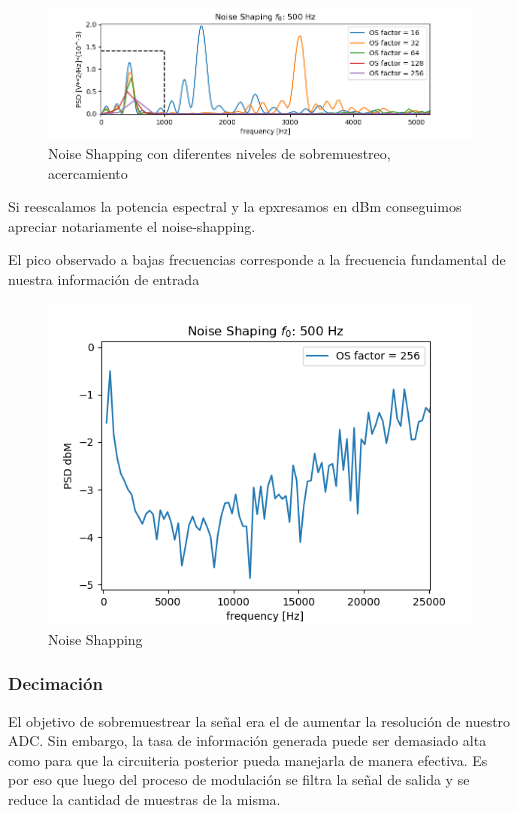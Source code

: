 \begin{figure}[H]
	\centering
	\includegraphics[width=\linewidth]{ImagenesEjercicio2/NoiseShappingSolidZoom.png}
	\caption{Noise Shapping con diferentes niveles de sobremuestreo, acercamiento}
	\label{fig:noiseshappingdemo1}
\end{figure}

Si reescalamos la potencia espectral y la epxresamos en dBm conseguimos apreciar notariamente el noise-shapping.

El pico observado a bajas frecuencias corresponde a la frecuencia fundamental de nuestra información de entrada
\begin{figure}[H]
	\centering
	\includegraphics[scale=0.7]{ImagenesEjercicio2/NoiseShappingdbM.png}
	\caption{Noise Shapping}
	\label{fig:noiseshappingdemo1}
\end{figure}

\subsubsection{Decimación}
El objetivo de sobremuestrear la señal era el de aumentar la resolución de nuestro ADC. Sin embargo, la tasa de información generada puede ser demasiado alta como para que la circuiteria posterior pueda manejarla de manera efectiva. Es por eso que luego del proceso de modulación se filtra la señal de salida y se reduce la cantidad de muestras de la misma.

